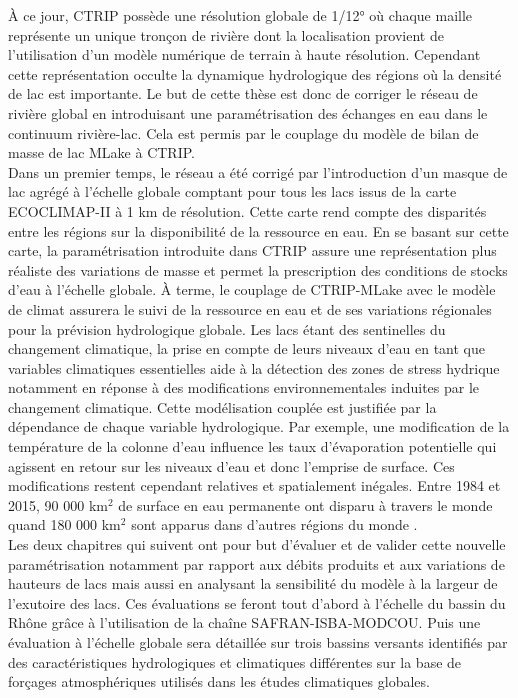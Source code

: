 À ce jour, CTRIP possède une résolution globale de 1/12° où chaque maille représente un unique tronçon de rivière dont la localisation provient de l'utilisation d'un modèle numérique de terrain à haute résolution. Cependant cette représentation occulte la dynamique hydrologique des régions où la densité de lac est importante. Le but de cette thèse est donc de corriger le réseau de rivière global en introduisant une paramétrisation des échanges en eau dans le continuum rivière-lac. Cela est permis par le couplage du modèle de bilan de masse de lac MLake à CTRIP. \\
Dans un premier temps, le réseau a été corrigé par l'introduction d'un masque de lac agrégé à l'échelle globale comptant pour tous les lacs issus de la carte ECOCLIMAP-II à 1 km de résolution. Cette carte rend compte des disparités entre les régions sur la disponibilité de la ressource en eau. En se basant sur cette carte, la paramétrisation introduite dans CTRIP assure une représentation plus réaliste des variations de masse et permet la prescription des conditions de stocks d'eau à l'échelle globale. À terme, le couplage de CTRIP-MLake avec le modèle de climat assurera le suivi de la ressource en eau et de ses variations régionales pour la prévision hydrologique globale. Les lacs étant des sentinelles du changement climatique, la prise en compte de leurs niveaux d'eau en tant que variables climatiques essentielles aide à la détection des zones de stress hydrique notamment en réponse à des modifications environnementales induites par le changement climatique. Cette modélisation couplée est justifiée par la dépendance de chaque variable hydrologique. Par exemple, une modification de la température de la colonne d'eau influence les taux d'évaporation potentielle qui agissent en retour sur les niveaux d'eau et donc l'emprise de surface. Ces modifications restent cependant relatives et spatialement inégales. Entre 1984 et 2015, 90 000 km$^{2}$ de surface en eau permanente ont disparu à travers le monde quand 180 000 km$^{2}$ sont apparus dans d'autres régions du monde \citep{pekel2016}. \\

\noindent Les deux chapitres qui suivent ont pour but d'évaluer et de valider cette nouvelle paramétrisation notamment par rapport aux débits produits et aux variations de hauteurs de lacs mais aussi en analysant la sensibilité du modèle à la largeur de l'exutoire des lacs. Ces évaluations se feront tout d'abord à l'échelle du bassin du Rhône grâce à l'utilisation de la chaîne SAFRAN-ISBA-MODCOU. Puis une évaluation à l'échelle globale sera détaillée sur trois bassins versants identifiés par des caractéristiques hydrologiques et climatiques différentes sur la base de forçages atmosphériques utilisés dans les études climatiques globales.
